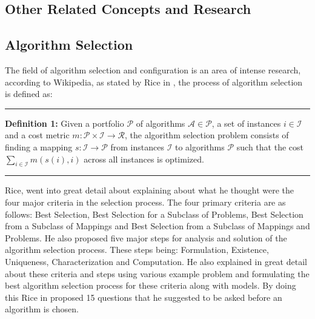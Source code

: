 \subsection{Other Related Concepts and Research}
\subsection*{Algorithm Selection}

The field of algorithm selection and configuration is an area of intense research, according to Wikipedia, as stated by Rice in \citep{rice197665}, the process of algorithm selection is defined as:

\par\noindent\rule{\textwidth}{0.4pt}\newline
\textbf{Definition 1:} Given a portfolio ${\displaystyle{\mathcal{P}}}$ of algorithms ${\displaystyle{\mathcal{A}} \in {\mathcal{P}}}$, a set of instances ${\displaystyle{i \in {\mathcal{I}}}}$ and a cost metric ${\displaystyle{m:{\mathcal{P}} \times {\mathcal{I}} \to \mathcal{R}}}$, the algorithm selection problem consists of finding a mapping ${\displaystyle s:{\mathcal {I}}\to {\mathcal {P}}}$ from instances ${\displaystyle {\mathcal {I}}}$ to algorithms ${\displaystyle {\mathcal {P}}}$ such that the cost ${\displaystyle \sum _{i\in {\mathcal {I}}}m(s(i),i)}$ across all instances is optimized.
\par\noindent\rule{\textwidth}{0.4pt}

Rice, went into great detail about explaining about what he thought were the four major criteria in the selection process. The four primary criteria are as follows: Best Selection, Best Selection for a Subclass of Problems, Best Selection from a Subclass of Mappings and Best Selection from a Subclass of Mappings and Problems. He also proposed five major steps for analysis and solution of the algorithm selection process. These steps being: Formulation, Existence, Uniqueness, Characterization and Computation. He also explained in great detail about these criteria and steps using various example problem and formulating the best algorithm selection process for these criteria along with models. By doing this Rice in \citep{rice197665} proposed 15 questions that he suggested to be asked before an algorithm is chosen.

